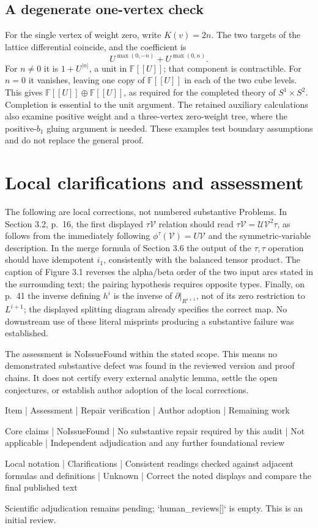 \documentclass[10pt]{article}
\begin{document}
\subsection*{A degenerate one-vertex check}
For the single vertex of weight zero, write \(K(v)=2n\). The two targets of the lattice differential coincide, and the coefficient is \[U^{\max(0,-n)}+U^{\max(0,n)}.\] For \(n\ne0\) it is \(1+U^{|n|}\), a unit in \(\mathbb F[[U]]\); that component is contractible. For \(n=0\) it vanishes, leaving one copy of \(\mathbb F[[U]]\) in each of the two cube levels. This gives \(\mathbb F[[U]]\oplus\mathbb F[[U]]\), as required for the completed theory of \(S^1\times S^2\). Completion is essential to the unit argument. The retained auxiliary calculations also examine positive weight and a three-vertex zero-weight tree, where the positive-\(b_1\) gluing argument is needed. These examples test boundary assumptions and do not replace the general proof.\par
\section*{Local clarifications and assessment}
The following are local corrections, not numbered substantive Problems. In Section 3.2, p. 16, the first displayed \(\tau\mathcal V\) relation should read \(\tau\mathcal V=\mathcal U\mathcal V^2\tau\), as follows from the immediately following \(\phi^\tau(\mathcal V)=U\mathcal V\) and the symmetric-variable description. In the merge formula of Section 3.6 the output of the \(\tau,\tau\) operation should have idempotent \(i_1\), consistently with the balanced tensor product. The caption of Figure 3.1 reverses the alpha/beta order of the two input arcs stated in the surrounding text; the pairing hypothesis requires opposite types. Finally, on p. 41 the inverse defining \(h^i\) is the inverse of \(\partial|_{R^{i+1}}\), not of its zero restriction to \(L^{i+1}\); the displayed splitting diagram already specifies the correct map. No downstream use of these literal misprints producing a substantive failure was established.\par
The assessment is NoIssueFound within the stated scope. This means no demonstrated substantive defect was found in the reviewed version and proof chains. It does not certify every external analytic lemma, settle the open conjectures, or establish author adoption of the local corrections.\par
Item | Assessment | Repair verification | Author adoption | Remaining work\par
Core claims | NoIssueFound | No substantive repair required by this audit | Not applicable | Independent adjudication and any further foundational review\par
Local notation | Clarifications | Consistent readings checked against adjacent formulas and definitions | Unknown | Correct the noted displays and compare the final published text\par
Scientific adjudication remains pending; `human\_reviews[]` is empty. This is an initial review.\par
\end{document}
